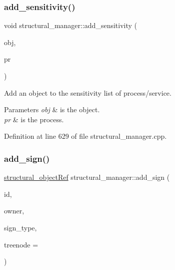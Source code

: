 \subsubsection{\texorpdfstring{add\+\_\+sensitivity()}{add\_sensitivity()}}
{\footnotesize\ttfamily void structural\+\_\+manager\+::add\+\_\+sensitivity (\begin{DoxyParamCaption}\item[{\hyperlink{structural__objects_8hpp_a8ea5f8cc50ab8f4c31e2751074ff60b2}{structural\+\_\+object\+Ref}}]{obj,  }\item[{\hyperlink{structural__objects_8hpp_a8ea5f8cc50ab8f4c31e2751074ff60b2}{structural\+\_\+object\+Ref}}]{pr }\end{DoxyParamCaption})}



Add an object to the sensitivity list of process/service. 


\begin{DoxyParams}{Parameters}
{\em obj} & is the object. \\
\hline
{\em pr} & is the process. \\
\hline
\end{DoxyParams}


Definition at line 629 of file structural\+\_\+manager.\+cpp.

\mbox{\label{classstructural__manager_a4a530daa9384ecd10119e11500bc3cd8}} 
\subsubsection{\texorpdfstring{add\+\_\+sign()}{add\_sign()}}
{\footnotesize\ttfamily \hyperlink{structural__objects_8hpp_a8ea5f8cc50ab8f4c31e2751074ff60b2}{structural\+\_\+object\+Ref} structural\+\_\+manager\+::add\+\_\+sign (\begin{DoxyParamCaption}\item[{std\+::string}]{id,  }\item[{\hyperlink{structural__objects_8hpp_a8ea5f8cc50ab8f4c31e2751074ff60b2}{structural\+\_\+object\+Ref}}]{owner,  }\item[{\hyperlink{structural__objects_8hpp_a219296792577e3292783725961506c83}{structural\+\_\+type\+\_\+descriptor\+Ref}}]{sign\+\_\+type,  }\item[{unsigned int}]{treenode = {} }\end{DoxyParamCaption})}



